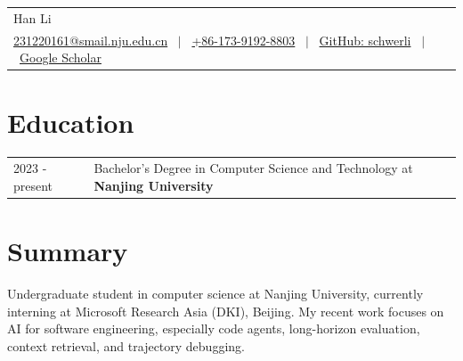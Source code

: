 \documentclass[a4paper,12pt]{article}
\begin{document}
\pagestyle{empty} 



\begin{tabularx}{\linewidth}{@{}X@{}}
\Huge{Han Li} \\[3pt]
\href{mailto:231220161@smail.nju.edu.cn}{231220161@smail.nju.edu.cn}
\ $|$ \
\href{tel:+8617391928803}{+86-173-9192-8803}
\ $|$ \
\href{https://github.com/schwerli}{GitHub: schwerli}
\ $|$ \
\href{https://scholar.google.com/citations?user=qbDL1kwAAAAJ\&hl=en}{Google Scholar}
\end{tabularx}
\vspace{0.2cm}


\section{Education}
\begin{tabularx}{\linewidth}{@{}l X@{}} 	
2023 - present & Bachelor's Degree in Computer Science and Technology at \textbf{Nanjing University} \\
\end{tabularx}

\section{Summary}
Undergraduate student in computer science at Nanjing University, currently interning at Microsoft Research Asia (DKI), Beijing. My recent work focuses on AI for software engineering, especially code agents, long-horizon evaluation, context retrieval, and trajectory debugging.
\end{document}
